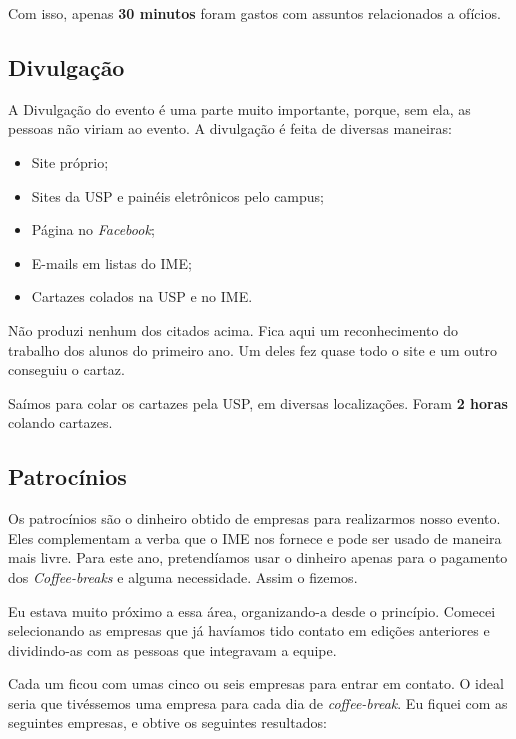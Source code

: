 \documentclass[12pt,letterpaper]{article}
\begin{document}
	Com isso, apenas \textbf{30 minutos} foram gastos com assuntos relacionados a ofícios.
	
	\subsection{Divulgação}
	
	A Divulgação do evento é uma parte muito importante, porque, sem ela, as pessoas não viriam ao evento. A divulgação é feita de diversas maneiras:
	
	\begin{itemize}
		\item Site próprio;
		\item Sites da USP e painéis eletrônicos pelo campus;
		\item Página no \textit{Facebook};
		\item E-mails em listas do IME;
		\item Cartazes colados na USP e no IME.
	\end{itemize}

	Não produzi nenhum dos citados acima. Fica aqui um reconhecimento do trabalho dos alunos do primeiro ano. Um deles fez quase todo o site e um outro conseguiu o cartaz. 
	
	Saímos para colar os cartazes pela USP, em diversas localizações\cite{cartazes}. Foram \textbf{2 horas} colando cartazes. 
	
	\subsection{Patrocínios}
	
	Os patrocínios são o dinheiro obtido de empresas para realizarmos nosso evento. Eles complementam a verba que o IME nos fornece e pode ser usado de maneira mais livre. Para este ano, pretendíamos usar o dinheiro apenas para o pagamento dos \textit{Coffee-breaks} e alguma necessidade. Assim o fizemos. 
	
	Eu estava muito próximo a essa área, organizando-a desde o princípio. Comecei selecionando as empresas que já havíamos tido contato em edições anteriores e dividindo-as com as pessoas que integravam a equipe. 
	
	Cada um ficou com umas cinco ou seis empresas para entrar em contato. O ideal seria que tivéssemos uma empresa para cada dia de \textit{coffee-break}. Eu fiquei com as seguintes empresas, e obtive os seguintes resultados:
	
\end{document}
